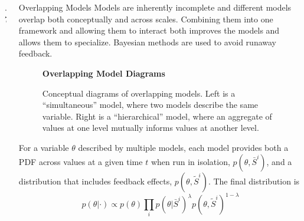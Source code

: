 \documentclass[final]{beamer}
\newlength{\sepwid}
\newlength{\onecolwid}
\begin{document}
\begin{frame}[fragile]
\begin{columns}[t]
    \begin{column}{.7\sepwid}\end{column}			%

    \begin{column}{\onecolwid}

      \begin{alertblock}{Overlapping Models}
        Models are inherently incomplete and different models overlap
        both conceptually and across scales.  Combining them into one
        framework and allowing them to interact both improves the
        models and allows them to specialize.  Bayesian methods are
        used to avoid runaway feedback.

        \begin{figure}[h]
          {\bf Overlapping Model Diagrams}

          \vspace{.1cm}
          \caption*{Conceptual diagrams of overlapping models.
            Left is a ``simultaneous'' model, where two models
            describe the same variable.  Right is a ``hierarchical''
            model, where an aggregate of values at one level mutually
            informs values at another level.}
        \end{figure}

        For a variable $\theta$ described by multiple models, each
        model provides both a PDF across values at a given time $t$
        when run in isolation, $p(\theta, \bar{S}^i)$, and a
        distribution that includes feedback effects, $p(\theta,
        \tilde{S}^i)$.  The final distribution is
        \[
        p(\theta | \cdot) \propto p(\theta) \prod_i p(\theta |
          \bar{S}^i)^\lambda p(\theta, \tilde{S}^i)^{1-\lambda}
        \]
      \end{alertblock}


\end{column}
\end{columns}
\end{frame}
\end{document}
